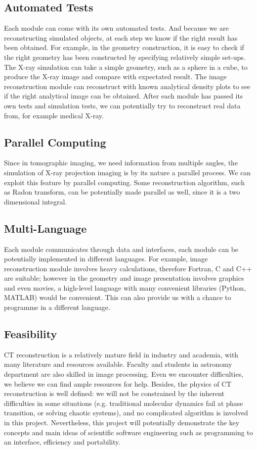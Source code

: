 \documentclass[11]{article}
\begin{document}
\subsection{Automated Tests}
	Each module can come with its own automated tests. And because we are reconstructing simulated objects, at each step we know if the right result has been obtained. For example, in the geometry construction, it is easy to check if the right geometry has been constructed by specifying relatively simple set-ups. The X-ray simulation can take a simple geometry, such as a sphere in a cube, to produce the X-ray image and compare with expectated result. The image reconstruction module can reconstruct with known analytical density plots to see if the right analytical image can be obtained. After each module has passed its own tests and simulation tests, we can potentially try to reconstruct real data from, for example medical X-ray.

\subsection{Parallel Computing}
	Since in tomographic imaging, we need information from multiple angles, the simulation of X-ray projection imaging is by its nature a parallel process. We can exploit this feature by parallel computing. Some reconstruction algorithm, such as Radon transform, can be potentially made parallel as well, since it is a two dimensional integral.

\subsection{Multi-Language}
	Each module communicates through data and interfaces, each module can be potentially implemented in different languages. For example, image reconstruction module involves heavy calculations, therefore Fortran, C and C++ are suitable; however in the geometry and image presentation involves graphics and even movies, a high-level language with many convenient libraries (Python, MATLAB) would be convenient. This can also provide us with a chance to programme in a different language.

\subsection{Feasibility}
	CT reconstruction is a relatively mature field in industry and academia, with many literature and resources available. Faculty and students in astronomy department are also skilled in image processing. Even we encounter difficulties, we believe we can find ample resources for help. Besides, the physics of CT reconstruction is well defined: we will not be constrained by the inherent difficulties in some situations (e.g. traditional molecular dynamics fail at phase transition, or solving chaotic systems), and no complicated algorithm is involved in this project. Nevertheless, this project will potentially demonstrate the key concepts and main ideas of scientific software engineering such as programming to an interface, efficiency and portability.
	
\end{document}
